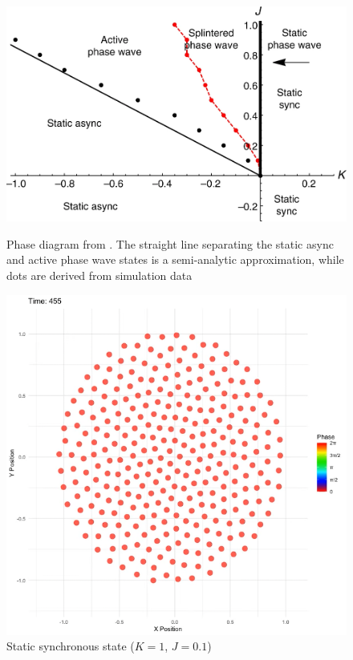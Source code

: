\begin{figure}[h]
 \centering
    \begin{minipage}{0.55\textwidth}
        \centering
        \includegraphics[width=\textwidth]{images/task1/phase_space.png}
        \caption{Phase diagram from \cite{O_Keeffe_2017}.  The straight line separating the static async and active phase wave states is a semi-analytic approximation, while dots are derived from simulation data}
        \label{fig:phase_space}
    \end{minipage}
    \hfill
    \begin{minipage}{0.4\textwidth}
        \centering
        \includegraphics[width=\textwidth]{images/task1/static_sync.png}
        \caption{Static synchronous state \newline ($K=1$, $J=0.1$)}
        \label{fig:static_sync}
    \end{minipage}
\end{figure}







